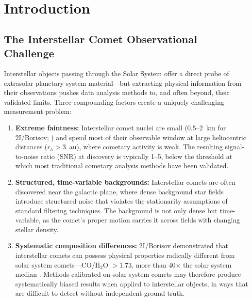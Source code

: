 \documentclass[preprint2]{aastex631}
\begin{document}
\begin{abstract}
stress test suite), random seeds, and a complete environment configuration are publicly available.
\end{abstract}


\section{Introduction}\label{sec:intro}

\subsection{The Interstellar Comet Observational Challenge}

Interstellar objects passing through the Solar System offer a direct probe of extrasolar planetary system material---but extracting physical information from their observations pushes data analysis methods to, and often beyond, their validated limits. Three compounding factors create a uniquely challenging measurement problem:

\begin{enumerate}
    \item \textbf{Extreme faintness:} Interstellar comet nuclei are small (0.5--2~km for 2I/Borisov; \citealt{jewitt20}) and spend most of their observable window at large heliocentric distances ($r_h > 3$~au), where cometary activity is weak. The resulting signal-to-noise ratio (SNR) at discovery is typically 1--5, below the threshold at which most traditional cometary analysis methods have been validated.
    \item \textbf{Structured, time-variable backgrounds:} Interstellar comets are often discovered near the galactic plane, where dense background star fields introduce structured noise that violates the stationarity assumptions of standard filtering techniques. The background is not only dense but time-variable, as the comet's proper motion carries it across fields with changing stellar density.
    \item \textbf{Systematic composition differences:} 2I/Borisov demonstrated that interstellar comets can possess physical properties radically different from solar system comets---CO/H$_2$O $> 1.73$, more than 40$\times$ the solar system median \citep{bodewits20}. Methods calibrated on solar system comets may therefore produce systematically biased results when applied to interstellar objects, in ways that are difficult to detect without independent ground truth.
\end{enumerate}
\end{document}
